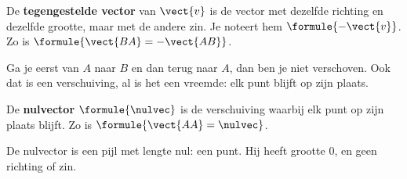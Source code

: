 \begin{theorie}
\begin{minipage}[t]{.64\linewidth}
\vspace{0pt}
De \textbf{\textcolor{accent}{tegengestelde vector}} van $\vect{v}$ is de vector met dezelfde richting en dezelfde grootte, maar met de andere zin. Je noteert hem $\formule{-\vect{v}}$. Zo is $\formule{\vect{BA} = -\vect{AB}}$.
\end{minipage}\hfill
\begin{minipage}[t]{.32\linewidth}
\vspace{1mm}
\centering
{}
\end{minipage}
\end{theorie}

Ga je eerst van $A$ naar $B$ en dan terug naar $A$, dan ben je niet verschoven. Ook dat is een verschuiving, al is het een vreemde: elk punt blijft op zijn plaats.

\begin{theorie}
De \textbf{\textcolor{accent}{nulvector}} $\formule{\nulvec}$ is de verschuiving waarbij elk punt op zijn plaats blijft. Zo is $\formule{\vect{AA} = \nulvec}$.
\end{theorie}

De nulvector is een pijl met lengte nul: een punt. Hij heeft grootte 0, en geen richting of zin.

